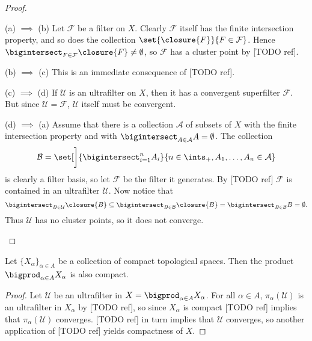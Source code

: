 \documentclass[article, a4paper, 11pt, oneside]{memoir}
\numberwithin{equation}{chapter}
\newcommand{\calU}{\mathcal{U}}
\newcommand{\calB}{\mathcal{B}}
\newcommand{\calF}{\mathcal{F}}
\newcommand{\calA}{\mathcal{A}}
\theoremstyle{nonumberplain}
\begin{document}
\begin{proof}
\begin{proofsec}
    \item[(a) $\implies$ (b)]
    Let $\calF$ be a filter on $X$. Clearly $\calF$ itself has the finite intersection property, and so does the collection $\set{ \closure{F}}{F \in \calF}$. Hence $\bigintersect_{F \in \calF} \closure{F} \neq \emptyset$, so $\calF$ has a cluster point by [TODO ref].

    \item[(b) $\implies$ (c)]
    This is an immediate consequence of [TODO ref].

    \item[(c) $\implies$ (d)]
    If $\calU$ is an ultrafilter on $X$, then it has a convergent superfilter $\calF$. But since $\calU = \calF$, $\calU$ itself must be convergent.

    \item[(d) $\implies$ (a)]
    Assume that there is a collection $\calA$ of subsets of $X$ with the finite intersection property and with $\bigintersect_{A \in \calA} A = \emptyset$. The collection
    \begin{equation*}
        \calB
            = \set[\bigg]{ \bigintersect_{i=1}^n A_i }{ n \in \ints_+, A_1, \ldots, A_n \in \calA }
    \end{equation*}
    is clearly a filter basis, so let $\calF$ be the filter it generates. By [TODO ref] $\calF$ is contained in an ultrafilter $\calU$. Now notice that
    \begin{equation*}
        \bigintersect_{B \in \calU} \closure{B}
            \subseteq \bigintersect_{B \in \calB} \closure{B}
            = \bigintersect_{B \in \calB} B
            = \emptyset.
    \end{equation*}
    Thus $\calU$ has no cluster points, so it does not converge.
\end{proofsec}
\end{proof}


\begin{theorem}
    Let $\{X_\alpha\}_{\alpha \in A}$ be a collection of compact topological spaces. Then the product $\bigprod_{\alpha \in A} X_\alpha$ is also compact.
\end{theorem}

\begin{proof}
    Let $\calU$ be an ultrafilter in $X = \bigprod_{\alpha \in A} X_\alpha$. For all $\alpha \in A$, $\pi_\alpha(\calU)$ is an ultrafilter in $X_\alpha$ by [TODO ref], so since $X_\alpha$ is compact [TODO ref] implies that $\pi_\alpha(\calU)$ converges. [TODO ref] in turn implies that $\calU$ converges, so another application of [TODO ref] yields compactness of $X$.
\end{proof}


\nocite{*}

\printbibliography
\end{document}
